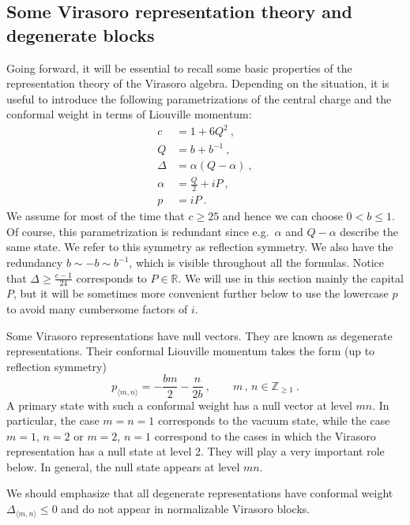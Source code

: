 \documentclass[12pt,a4paper]{article}
\newcommand{\be}{\begin{equation}}
\newcommand{\ee}{\end{equation}}
\newcommand\ZZ{\mathbb{Z}}
\newcommand\RR{\mathbb{R}}
\begin{document}
\subsection{Some Virasoro representation theory and degenerate blocks}
Going forward, it will be essential to recall some basic properties of the representation theory of the Virasoro algebra.
Depending on the situation, it is useful to introduce the following parametrizations of the central charge and the conformal weight in terms of Liouville momentum:
\begin{subequations}
\begin{align} 
c&=1+6Q^2\ , \label{eq:definition Q}\\
Q&=b+b^{-1}\ ,  \label{eq:definition b}\\
\Delta&=\alpha(Q-\alpha)\ , \label{eq:definition alpha}\\
\alpha&=\frac{Q}{2}+i P\ , \label{eq:definition P} \\
p&=i P\ . \label{eq:definition p}%
\end{align}
\end{subequations}
We assume for most of the time that $c \ge 25$ and hence we can choose $0<b\le 1$. Of course, this parametrization is redundant since e.g.\ $\alpha$ and $Q-\alpha$ describe the same state. We refer to this symmetry as reflection symmetry. We also have the redundancy $b \sim -b \sim b^{-1}$, which is visible throughout all the formulas. Notice that $\Delta \ge \frac{c-1}{24}$ corresponds to $P \in \RR$. We will use in this section mainly the capital $P$, but it will be sometimes more convenient further below to use the lowercase $p$ to avoid many cumbersome factors of $i$.

Some Virasoro representations have null vectors. They are known as degenerate representations. Their conformal Liouville momentum takes the form (up to reflection symmetry)
\be 
p_{\langle m,n\rangle }=-\frac{bm}{2}-\frac{n}{2b}\ , \qquad m\, ,\, n \in \ZZ_{\ge 1}\ . \label{eq:Liouville momenta degenerate representations}
\ee
A primary state with such a conformal weight has a null vector at level $mn$.
In particular, the case $m=n=1$ corresponds to the vacuum state, while the case $m=1$, $n=2$ or $m=2$, $n=1$ correspond to the cases in which the Virasoro representation has a null state at level 2. They will play a very important role below. In general, the null state appears at level $mn$. 

We should emphasize that all degenerate representations have conformal weight $\Delta_{\langle m,n \rangle} \le 0$ and do not appear in normalizable Virasoro blocks.
\end{document}
